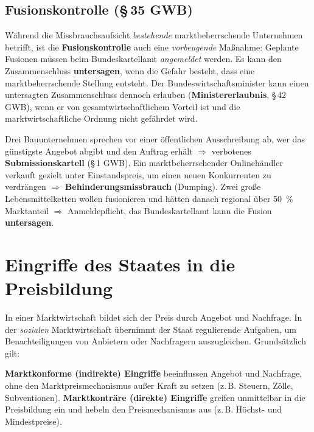 \documentclass[11pt, a4paper]{article}
\begin{document}
\subsection{Fusionskontrolle (\S\,35 GWB)}

Während die Missbrauchsaufsicht \emph{bestehende} marktbeherrschende Unternehmen betrifft,
ist die \textbf{Fusionskontrolle} auch eine \emph{vorbeugende} Maßnahme: Geplante Fusionen
müssen beim Bundeskartellamt \emph{angemeldet} werden. Es kann den Zusammenschluss
\textbf{untersagen}, wenn die Gefahr besteht, dass eine marktbeherrschende Stellung
entsteht. Der Bundeswirtschaftsminister kann einen untersagten Zusammenschluss dennoch
erlauben (\textbf{Ministererlaubnis}, \S\,42 GWB), wenn er von gesamtwirtschaftlichem
Vorteil ist und die marktwirtschaftliche Ordnung nicht gefährdet wird.

\begin{beispiel}
Drei Bauunternehmen sprechen vor einer öffentlichen Ausschreibung ab, wer das günstigste
Angebot abgibt und den Auftrag erhält $\Rightarrow$ verbotenes
\textbf{Submissionskartell} (\S\,1 GWB). Ein marktbeherrschender Onlinehändler verkauft
gezielt unter Einstandspreis, um einen neuen Konkurrenten zu verdrängen $\Rightarrow$
\textbf{Behinderungsmissbrauch} (Dumping). Zwei große Lebensmittelketten wollen
fusionieren und hätten danach regional über 50~\% Marktanteil $\Rightarrow$ Anmeldepflicht,
das Bundeskartellamt kann die Fusion \textbf{untersagen}.
\end{beispiel}

\section{Eingriffe des Staates in die Preisbildung}

In einer Marktwirtschaft bildet sich der Preis durch Angebot und Nachfrage. In der
\emph{sozialen} Marktwirtschaft übernimmt der Staat regulierende Aufgaben, um
Benachteiligungen von Anbietern oder Nachfragern auszugleichen. Grundsätzlich gilt:

\begin{merksatz}
\textbf{Marktkonforme (indirekte) Eingriffe} beeinflussen Angebot und Nachfrage, ohne den
Marktpreismechanismus außer Kraft zu setzen (z.\,B. Steuern, Zölle, Subventionen).
\textbf{Marktkonträre (direkte) Eingriffe} greifen unmittelbar in die Preisbildung ein
und hebeln den Preismechanismus aus (z.\,B. Höchst- und Mindestpreise).
\end{merksatz}
\end{document}
